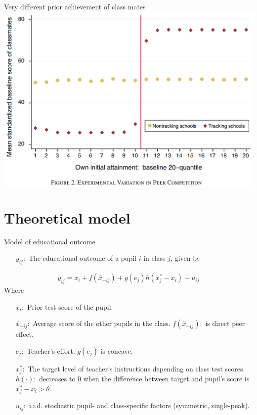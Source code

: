 \documentclass[9pt]{beamer}
\numberwithin{equation}{section}
\begin{document}
\begin{frame}{Very different prior achievement of class mates}
  \includegraphics[width= \textwidth]{variation}
\end{frame}


\section{Theoretical model}

\begin{frame}{Model of educational outcome}
  \begin{itemize}
    \item[$y_{ij}:$] The educational outcome of a pupil $i$ in class $j$, given by
  \end{itemize}
  \begin{align}
    y_{ij}=x_{i}+f(\bar{x}_{-ij}) + g(e_{j})h(x_j^{*} - x_{i}) + u_{ij}
    \label{eq:outcome}
  \end{align}
  Where
  \begin{itemize}
    \item[$x_{i}:$] Prior test score of the pupil.
    \item[$\bar{x}_{-ij}:$] Average score of the other pupils in the class. $f(\bar{x}_{-ij}):$ is direct peer effect.
    \item[$e_{j}:$] Teacher's effort. $g(e_{j})$ is concave.
    \item[$x_j^{*}:$] The target level of teacher's instructions depending on class test scores.\\
      $h(\cdot):$ decreases to 0 when the difference between target and pupil's score is $x_j^{*} - x_{i}>\theta$.
    \item[$u_{ij}:$] i.i.d. stochastic pupil- and class-specific factors (symmetric, single-peak).
  \end{itemize}
\end{frame}
\end{document}
